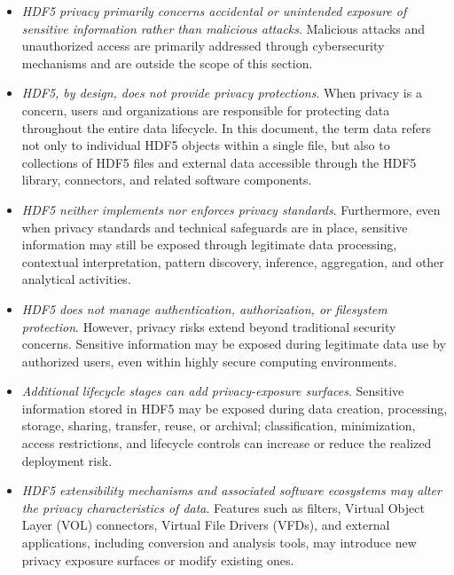 \documentclass[../main.tex]{subfiles}
\begin{document}
\begin{itemize}
    \item \emph{HDF5 privacy primarily concerns accidental or unintended exposure of sensitive information
          rather than malicious attacks}. Malicious attacks and unauthorized access are primarily
          addressed through cybersecurity mechanisms and are outside the scope of this section.
    \item \emph{HDF5, by design, does not provide privacy protections}. When privacy is a concern, users and organizations
           are responsible for protecting data throughout the entire data lifecycle. In this document,
           the term data refers not only to individual HDF5 objects within a single file, but also to
           collections of HDF5 files and external data accessible through the HDF5 library,
           connectors, and related software components.
    \item \emph{HDF5 neither implements nor enforces privacy standards}. Furthermore, even when privacy
          standards and technical safeguards are in place, sensitive information may still be exposed
          through legitimate data processing, contextual interpretation, pattern discovery, inference,
          aggregation, and other analytical activities.
    \item \emph{HDF5 does not manage authentication, authorization, or filesystem protection}. However, privacy
          risks extend beyond traditional security concerns. Sensitive information may be exposed during
          legitimate data use by authorized users, even within highly secure computing environments.
    \item \emph{Additional lifecycle stages can add privacy-exposure surfaces}.
          Sensitive information stored in HDF5 may be exposed during data creation,
          processing, storage, sharing, transfer, reuse, or archival; classification,
          minimization, access restrictions, and lifecycle controls can increase or
          reduce the realized deployment risk.
    \item \emph{HDF5 extensibility mechanisms and associated software ecosystems may alter the privacy characteristics of data}.
          Features such as filters, Virtual Object Layer (VOL) connectors, Virtual File Drivers (VFDs), and
          external applications, including conversion and analysis tools, may introduce new privacy
          exposure surfaces or modify existing ones.
\end{itemize}
\end{document}
